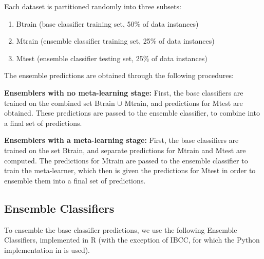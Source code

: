 \documentclass{bmcart}
\begin{document}
Each dataset is partitioned randomly into three subsets:
\begin{enumerate}
\item Btrain (base classifier training set, 50\% of data instances)
\item Mtrain (ensemble classifier training set, 25\% of data instances)
\item Mtest (ensemble classifier testing set, 25\% of data instances)
\end{enumerate}

\noindent
The ensemble predictions are obtained through the following procedures:

\vspace{1cm}
\noindent
\textbf{Ensemblers with no meta-learning stage:}
First, the base classifiers are trained on the combined set Btrain $\cup$ Mtrain, and predictions for Mtest are obtained. These predictions are passed to the ensemble classifier, to combine into a final set of predictions.

\noindent
\textbf{Ensemblers with a meta-learning stage:}
First, the base classifiers are trained on the set Btrain, and separate predictions for Mtrain and Mtest are computed. The predictions for Mtrain are passed to the ensemble classifier to train the meta-learner, which then is given the predictions for Mtest in order to ensemble them into a final set of predictions.


\subsection*{Ensemble Classifiers}

To ensemble the base classifier predictions, we use the following Ensemble Classifiers, implemented in R (with the exception of IBCC, for which the Python implementation in \cite{Simpson13} is used).
\end{document}

